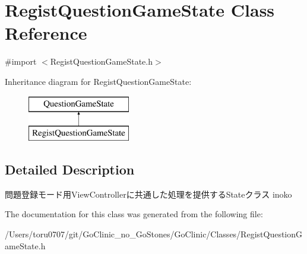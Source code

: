 \hypertarget{interface_regist_question_game_state}{
\section{RegistQuestionGameState Class Reference}
\label{interface_regist_question_game_state}
}


{\ttfamily \#import $<$RegistQuestionGameState.h$>$}

Inheritance diagram for RegistQuestionGameState:\begin{figure}[H]
\begin{center}
\leavevmode
\includegraphics[height=2.000000cm]{interface_regist_question_game_state}
\end{center}
\end{figure}


\subsection{Detailed Description}
問題登録モード用ViewControllerに共通した処理を提供するStateクラス  inoko 

The documentation for this class was generated from the following file:\begin{DoxyCompactItemize}
\item 
/Users/toru0707/git/GoClinic\_\-no\_\-GoStones/GoClinic/Classes/RegistQuestionGameState.h\end{DoxyCompactItemize}
